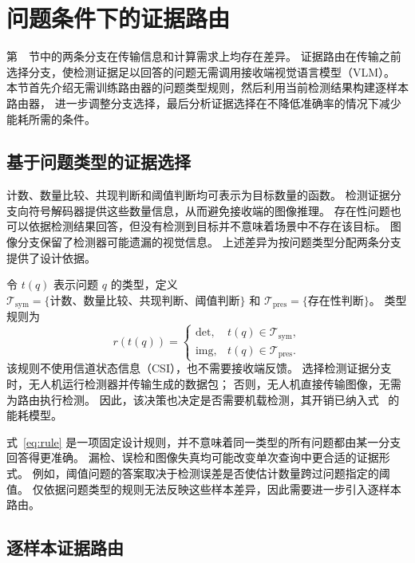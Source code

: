 \section{问题条件下的证据路由}\label{sec:routing}

第~~节中的两条分支在传输信息和计算需求上均存在差异。
证据路由在传输之前选择分支，使检测证据足以回答的问题无需调用接收端视觉语言模型（VLM）。
本节首先介绍无需训练路由器的问题类型规则，然后利用当前检测结果构建逐样本路由器，
进一步调整分支选择，最后分析证据选择在不降低准确率的情况下减少能耗所需的条件。

\subsection{基于问题类型的证据选择}

计数、数量比较、共现判断和阈值判断均可表示为目标数量的函数。
检测证据分支向符号解码器提供这些数量信息，从而避免接收端的图像推理。
存在性问题也可以依据检测结果回答，但没有检测到目标并不意味着场景中不存在该目标。
图像分支保留了检测器可能遗漏的视觉信息。
上述差异为按问题类型分配两条分支提供了设计依据。

令 $t(q)$ 表示问题 $q$ 的类型，定义
$\mathcal T_{\mathrm{sym}}=\{\text{计数、数量比较、共现判断、阈值判断}\}$
和 $\mathcal T_{\mathrm{pres}}=\{\text{存在性判断}\}$。
类型规则为
\begin{equation}
r(t(q))=
\begin{cases}
\mathrm{det}, & t(q)\in\mathcal T_{\mathrm{sym}},\\
\mathrm{img}, & t(q)\in\mathcal T_{\mathrm{pres}}.
\end{cases}
\label{eq:rule}
\end{equation}
该规则不使用信道状态信息（CSI），也不需要接收端反馈。
选择检测证据分支时，无人机运行检测器并传输生成的数据包；
否则，无人机直接传输图像，无需为路由执行检测。
因此，该决策也决定是否需要机载检测，其开销已纳入式~ 的能耗模型。

式~\eqref{eq:rule} 是一项固定设计规则，并不意味着同一类型的所有问题都由某一分支回答得更准确。
漏检、误检和图像失真均可能改变单次查询中更合适的证据形式。
例如，阈值问题的答案取决于检测误差是否使估计数量跨过问题指定的阈值。
仅依据问题类型的规则无法反映这些样本差异，因此需要进一步引入逐样本路由。

\subsection{逐样本证据路由}

